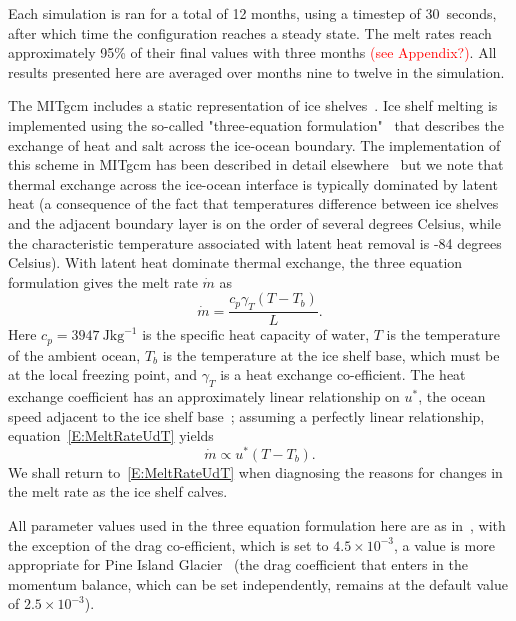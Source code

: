 \documentclass[draft]{agujournal2019}
\newcommand{\red}[1]{\textcolor{red}{#1}}
\begin{document}
Each simulation is ran for a total of 12 months, using a timestep of 30~\si{seconds}, after which time the configuration reaches a steady state. The melt rates reach approximately 95\% of their final values with three months \red{(see Appendix?)}. All results presented here are averaged over months nine to twelve in the simulation. 

The MITgcm includes a static representation of ice shelves~\cite{Losch2008JGeophysResOceans}. Ice shelf melting is implemented using the so-called "three-equation formulation"~\cite{Holland1999JPhysOcean} that describes the exchange of heat and salt across the ice-ocean boundary. The implementation of this scheme in MITgcm has been described in detail elsewhere~\cite[for example]{DeRydt2014JGeophysResOceans,Dansereau2014JGROceans} but we note that thermal exchange across the ice-ocean interface is typically dominated by latent heat (a consequence of the fact that temperatures difference between ice shelves and the adjacent boundary layer is on the order of several degrees Celsius, while the characteristic temperature associated with latent heat removal is -84 degrees Celsius). With latent heat dominate thermal exchange, the three equation formulation gives the melt rate $\dot{m}$ as
\begin{equation}\label{E:MeltRate}
    \dot{m} = \frac{c_p \gamma_T (T - T_b)}{L}.
\end{equation}
Here $c_p = 3947~\si{\joule \kilogram}^{-1}$ is the specific heat capacity of water, $T$ is the temperature of the ambient ocean, $T_b$ is the temperature at the ice shelf base, which must be at the local freezing point, and $\gamma_T$ is a heat exchange co-efficient. The heat exchange coefficient has an approximately linear relationship on $u^*$, the ocean speed adjacent to the ice shelf base~\cite{Holland1999JPhysOcean}; assuming a perfectly linear relationship, equation~\eqref{E:MeltRateUdT} yields
\begin{equation}\label{E:MeltRateUdT}
    \dot{m} \propto u^* (T - T_b).
\end{equation}
We shall return to~\eqref{E:MeltRateUdT} when diagnosing the reasons for changes in the melt rate as the ice shelf calves.

All parameter values used in the three equation formulation here are as in~, with the exception of the drag co-efficient, which is set to $4.5\times10^{-3}$, a value is more appropriate for Pine Island Glacier~\cite{Dutrieux2014Science} (the drag coefficient that enters in the momentum balance, which can be set independently, remains at the default value of $2.5\times 10^{-3}$).
\end{document}
